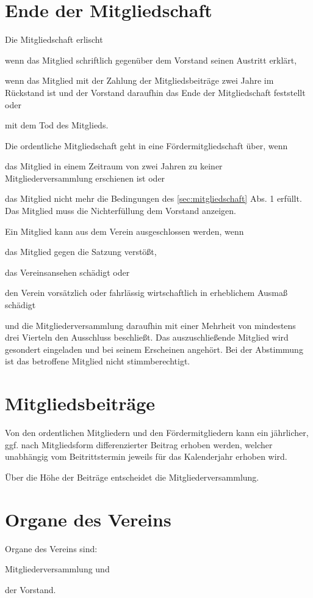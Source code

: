 \section{Ende der Mitgliedschaft}\label{sec:ende_der_mitgliedschaft}
\begin{absätze}
    \item Die Mitgliedschaft erlischt
    \begin{sätze}
        \item wenn das Mitglied schriftlich gegenüber dem Vorstand seinen Austritt erklärt,
        \item wenn das Mitglied mit der Zahlung der Mitgliedsbeiträge zwei Jahre im Rückstand ist und der Vorstand daraufhin das Ende der Mitgliedschaft feststellt oder
        \item mit dem Tod des Mitglieds.
    \end{sätze}
    \item Die ordentliche Mitgliedschaft geht in eine Fördermitgliedschaft über, wenn
    \begin{sätze}
        \item das Mitglied in einem Zeitraum von zwei Jahren zu keiner Mitgliederversammlung erschienen ist oder
        \item das Mitglied nicht mehr die Bedingungen des \ref{sec:mitgliedschaft} Abs. 1 erfüllt. Das Mitglied muss die Nichterfüllung dem Vorstand anzeigen.
    \end{sätze}
    \item Ein Mitglied kann aus dem Verein ausgeschlossen werden, wenn
    \begin{sätze}
        \item das Mitglied gegen die Satzung verstößt,
        \item das Vereinsansehen schädigt oder
        \item den Verein vorsätzlich oder fahrlässig wirtschaftlich in erheblichem Ausmaß schädigt
    \end{sätze}
    und die Mitgliederversammlung daraufhin mit einer Mehrheit von mindestens drei Vierteln den Ausschluss beschließt. Das auszuschließende Mitglied wird gesondert eingeladen und bei seinem Erscheinen angehört. Bei der Abstimmung ist das betroffene Mitglied nicht stimmberechtigt.
	\end{absätze}

\section{Mitgliedsbeiträge}
	\begin{absätze}
		\item Von den ordentlichen Mitgliedern und den Fördermitgliedern kann ein jährlicher, ggf. nach Mitgliedsform differenzierter Beitrag erhoben werden, welcher unabhängig vom Beitrittstermin jeweils für das Kalenderjahr erhoben wird.
		\item Über die Höhe der Beiträge entscheidet die Mitgliederversammlung.
	\end{absätze}

\section{Organe des Vereins}
    Organe des Vereins sind:
	\begin{compactenum}
		\item Mitgliederversammlung und
		\item der Vorstand.
	\end{compactenum}
